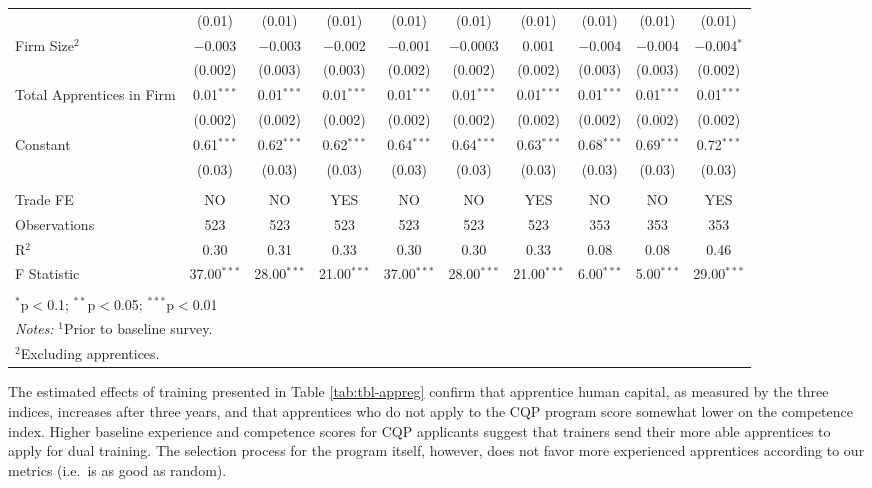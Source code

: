 \documentclass[
  a4paper, twoside, 12pt]{book}
\begin{document}
\begin{singlespacing}
\begin{table}[H]
\begin{tabular}{@{\extracolsep{-8pt}}lccccccccc}
  & (0.01) & (0.01) & (0.01) & (0.01) & (0.01) & (0.01) & (0.01) & (0.01) & (0.01) \\ 
  Firm Size$^2$ & $-$0.003 & $-$0.003 & $-$0.002 & $-$0.001 & $-$0.0003 & 0.001 & $-$0.004 & $-$0.004 & $-$0.004$^{*}$ \\ 
  & (0.002) & (0.003) & (0.003) & (0.002) & (0.002) & (0.002) & (0.003) & (0.003) & (0.002) \\ 
  Total Apprentices in Firm & 0.01$^{***}$ & 0.01$^{***}$ & 0.01$^{***}$ & 0.01$^{***}$ & 0.01$^{***}$ & 0.01$^{***}$ & 0.01$^{***}$ & 0.01$^{***}$ & 0.01$^{***}$ \\ 
  & (0.002) & (0.002) & (0.002) & (0.002) & (0.002) & (0.002) & (0.002) & (0.002) & (0.002) \\ 
  Constant & 0.61$^{***}$ & 0.62$^{***}$ & 0.62$^{***}$ & 0.64$^{***}$ & 0.64$^{***}$ & 0.63$^{***}$ & 0.68$^{***}$ & 0.69$^{***}$ & 0.72$^{***}$ \\ 
  & (0.03) & (0.03) & (0.03) & (0.03) & (0.03) & (0.03) & (0.03) & (0.03) & (0.03) \\ 
 \hline \\[-1.8ex] 
Trade FE & NO & NO & YES & NO & NO & YES & NO & NO & YES \\ 
Observations & 523 & 523 & 523 & 523 & 523 & 523 & 353 & 353 & 353 \\ 
R$^{2}$ & 0.30 & 0.31 & 0.33 & 0.30 & 0.30 & 0.33 & 0.08 & 0.08 & 0.46 \\ 
F Statistic & 37.00$^{***}$ & 28.00$^{***}$ & 21.00$^{***}$ & 37.00$^{***}$ & 28.00$^{***}$ & 21.00$^{***}$ & 6.00$^{***}$ & 5.00$^{***}$ & 29.00$^{***}$ \\ 
\hline 
\hline \\[-1.8ex] 
\multicolumn{10}{l}{$^{*}$p$<$0.1; $^{**}$p$<$0.05; $^{***}$p$<$0.01} \\ 
\multicolumn{10}{l}{\textit{Notes:} $^1$Prior to baseline survey.} \\ 
\multicolumn{10}{l}{$^2$Excluding apprentices.} \\ 
\end{tabular} 
\end{table} 
\end{singlespacing}

The estimated effects of training presented in Table \ref{tab:tbl-appreg} confirm that apprentice human capital, as measured by the three indices, increases after three years, and that apprentices who do not apply to the CQP program score somewhat lower on the competence index. Higher baseline experience and competence scores for CQP applicants suggest that trainers send their more able apprentices to apply for dual training. The selection process for the program itself, however, does not favor more experienced apprentices according to our metrics (i.e.~is as good as random).
\end{document}
